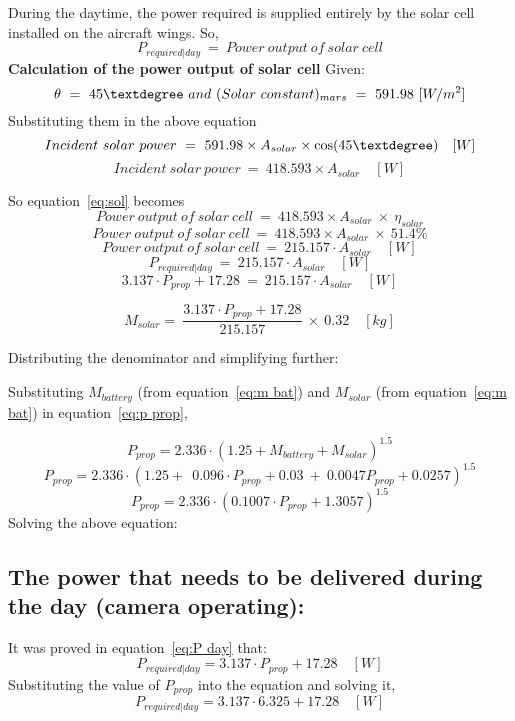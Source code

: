 \p During the daytime, the power required is supplied entirely by the solar cell installed on the aircraft wings. So,
\[ P_{required|day} \ = \ Power \ output \ of \ solar \ cell \]
\p \textbf{Calculation of the power output of solar cell}
 
Given:
\[ \theta \ = \ 45 \textdegree \ and \  (Solar\ constant)_{mars} \ = \ 591.98 \ [W/m^2] \]
Substituting them in the above equation
\[ Incident \ solar \ power \ = \ 591.98 \times A_{solar} \times \cos(45\textdegree) \quad [W] \]
\[ Incident \ solar \ power \ = \ 418.593 \times A_{solar} \quad [W] \]

So equation~\ref{eq:sol} becomes
\[ Power \ output \ of \ solar \ cell \ = \ 418.593 \times A_{solar} \ \times \ \eta_{solar} \]
\[ Power \ output \ of \ solar \ cell \ = \ 418.593 \times A_{solar} \ \times \ 51.4\% \]
\[ Power \ output \ of \ solar \ cell \ = \ 215.157 \cdot A_{solar} \quad [W] \]
\[ P_{required|day} \ = \ 215.157 \cdot A_{solar} \quad [W] \]
\[ 3.137 \cdot P_{prop} + 17.28 \ = \ 215.157 \cdot A_{solar} \quad [W] \]



\[ M_{solar} = \ \frac{ 3.137 \cdot P_{prop} + 17.28 }{ 215.157 } \ \times \ 0.32 \quad [kg] \]

Distributing the denominator and simplifying further:
\vspace{0.5cm}

\p Substituting $ M_{battery} $ (from equation~\ref{eq:m bat}) and $ M_{solar} $ (from equation~\ref{eq:m bat}) in equation~\ref{eq:p prop},

\[ P_{prop} = 2.336 \cdot (1.25 + M_{battery} + M_{solar})^{1.5} \]
\[ P_{prop} = 2.336 \cdot (1.25 + \ \ 0.096 \cdot P_{prop} + 0.03 \ + \ 0.0047 P_{prop} + 0.0257 )^{1.5} \] 
\[ P_{prop} = 2.336 \cdot ( 0.1007 \cdot P_{prop} + 1.3057 )^{1.5} \]
Solving the above equation:
\boxone

\subsection{The power that needs to be delivered during the day (camera operating):} \vspace{0.1cm}
It was proved in equation~\ref{eq:P day} that:
\[ P_{required|day} = 3.137 \cdot P_{prop} + 17.28 \quad [W] \]
Substituting the value of $ P_{prop} $ into the equation and solving it,
\[ P_{required|day} = 3.137 \cdot 6.325 + 17.28 \quad [W] \]
\boxtwo

